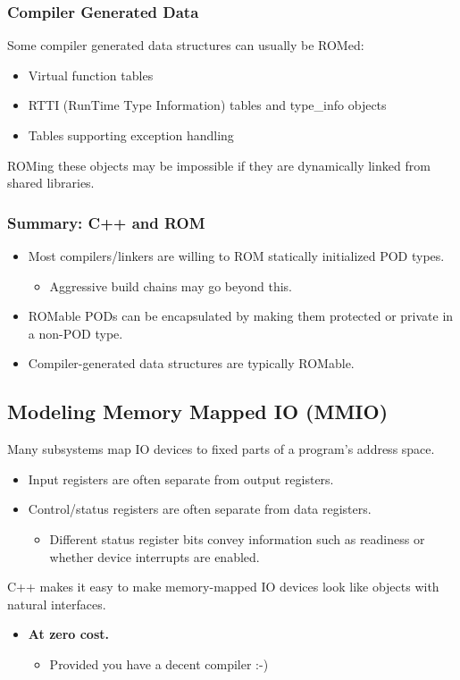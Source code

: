 \subsubsection{Compiler Generated Data}
Some compiler generated data structures can usually be ROMed:
\begin{itemize}
  \item Virtual function tables
  \item RTTI (RunTime Type Information) tables and type\_info objects
  \item Tables supporting exception handling
\end{itemize}
ROMing these objects may be impossible if they are dynamically linked from shared libraries.

\subsubsection{Summary: C++ and ROM}
\begin{itemize}
  \item Most compilers/linkers are willing to ROM statically initialized POD types.
  \begin{itemize}
    \item Aggressive build chains may go beyond this.
  \end{itemize}
  \item ROMable PODs can be encapsulated by making them protected or private in a non-POD type.
  \item Compiler-generated data structures are typically ROMable.
\end{itemize}


\subsection{Modeling Memory Mapped IO (MMIO)}
Many subsystems map IO devices to fixed parts of a program's address space.
\begin{itemize}
  \item Input registers are often separate from output registers.
  \item Control/status registers are often separate from data registers.
  \begin{itemize}
    \item Different status register bits convey information such as readiness or whether device interrupts are enabled.
  \end{itemize}
\end{itemize}
C++ makes it easy to make memory-mapped IO devices look like objects with natural interfaces.
\begin{itemize}
  \item \textbf{At zero cost.}
  \begin{itemize}
    \item Provided you have a decent compiler :-)
  \end{itemize}
\end{itemize}

